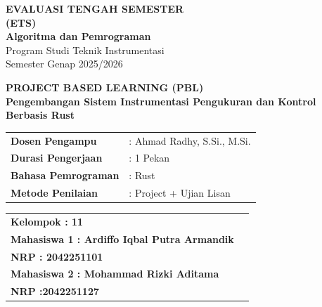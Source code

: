 \documentclass[12pt,a4paper]{article}
\begin{document}
\begin{titlepage}
    \centering
    
    {\LARGE \textbf{EVALUASI TENGAH SEMESTER}} \\[0.2cm]
    {\LARGE \textbf{(ETS)}} \\[0.5cm]
    
    {\Large \textbf{Algoritma dan Pemrograman}} \\[0.8cm]
    
    {\large Program Studi Teknik Instrumentasi} \\[0.2cm]
    {\large Semester Genap 2025/2026} \\[1.5cm]
    
    \begin{tcolorbox}[
        colback=boxblue, 
        colframe=borderblue, 
        width=0.9\textwidth, 
        arc=5pt, 
        boxrule=1pt,
        center title,
        halign=center
    ]
        \centering
        \textbf{\large PROJECT BASED LEARNING (PBL)} \\[0.3cm]
        \textbf{Pengembangan Sistem Instrumentasi Pengukuran dan Kontrol \\ Berbasis Rust}
    \end{tcolorbox}
    
    \vfill 
    
    \begin{flushleft}
    \hspace{2.5cm} 
    \begin{tabular}{ll}
        \textbf{Dosen Pengampu}  & : Ahmad Radhy, S.Si., M.Si. \\
        \textbf{Durasi Pengerjaan} & : 1 Pekan \\
        \textbf{Bahasa Pemrograman} & : Rust \\
        \textbf{Metode Penilaian}  & : Project + Ujian Lisan \\
    \end{tabular}
    \end{flushleft}
    
    \vspace{1.5cm}
    
    \begin{flushleft}
    \hspace{2.5cm}
    \begin{tabular}{ll}
        \textbf{Kelompok : 11} &  \\[0.3cm] 
        \textbf{Mahasiswa 1 : Ardiffo Iqbal Putra Armandik} &  \\[0.1cm]
        \textbf{NRP : 2042251101} &  \\[0.3cm]
        \textbf{Mahasiswa 2 : Mohammad Rizki Aditama} &  \\[0.1cm]
        \textbf{NRP :2042251127} &  \\
    \end{tabular}
    \end{flushleft}
    

\end{titlepage}
\end{document}
